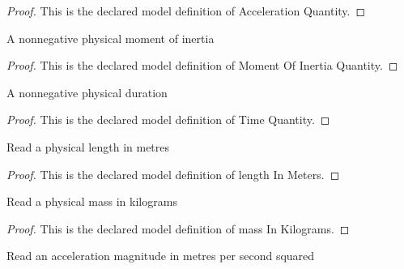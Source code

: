 \begin{proof}
  This is the declared model definition of Acceleration Quantity.
\end{proof}
\begin{definition}
  \label{def:physics:phyx-mini-0266:phyxminiproblems-problemphyxmini0266-momentofinertiaquantity}
  A nonnegative physical moment of inertia
\end{definition}
\begin{proof}
  This is the declared model definition of Moment Of Inertia Quantity.
\end{proof}
\begin{definition}
  \label{def:physics:phyx-mini-0266:phyxminiproblems-problemphyxmini0266-timequantity}
  A nonnegative physical duration
\end{definition}
\begin{proof}
  This is the declared model definition of Time Quantity.
\end{proof}
\begin{definition}
  \label{def:physics:phyx-mini-0266:phyxminiproblems-problemphyxmini0266-lengthinmeters}
  Read a physical length in metres
\end{definition}
\begin{proof}
  This is the declared model definition of length In Meters.
\end{proof}
\begin{definition}
  \label{def:physics:phyx-mini-0266:phyxminiproblems-problemphyxmini0266-massinkilograms}
  Read a physical mass in kilograms
\end{definition}
\begin{proof}
  This is the declared model definition of mass In Kilograms.
\end{proof}
\begin{definition}
  \label{def:physics:phyx-mini-0266:phyxminiproblems-problemphyxmini0266-accelerationinmeterspersecondsquared}
  Read an acceleration magnitude in metres per second squared
\end{definition}
